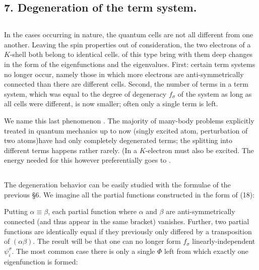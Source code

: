 \begin{paper}{1}
\section*{7. Degeneration of the term system.}
\subsection{} In the cases occurring in nature, the quantum cells are not all different from one another. Leaving the spin properties out of consideration, the two electrons of a $K$-shell both belong to identical cells.  of this type bring with them deep changes in the form of the eigenfunctions and the eigenvalues. First: certain term systems no longer occur, namely those in which more electrons are anti-symmetrically connected than there are different cells. Second, the number of terms in a term system, which was equal to the degree of degeneracy $f_\sigma$ of the system as long as all cells were different, is now smaller; often only a single term is left.

We name this last phenomenon . The majority of many-body problems explicitly treated in quantum mechanics up to now (singly excited  atom, perturbation of two  atoms)have had only completely degenerated terms; the splitting into different terms happens rather rarely. (In  a $K$-electron must also be excited. The energy needed for this however preferentially goes to .

\subsection{} The degeneration behavior can be easily studied with the formulae of the previous \S6. We imagine all the partial functions constructed in the form of (18):

Putting $\alpha \equiv \beta$, each partial function where $\alpha$ and $\beta$ are anti-symmetrically connected (and thus appear in the same bracket) vanishes. Further, two partial functions are identically equal if they previously only differed by a transposition of $(\alpha\beta)$. The result will be that one can no longer form $f_\sigma$ linearly-independent $\psi_i^\sigma$. The most common case there is only a single $\Phi$ left from which exactly one eigenfunction is formed:


\end{paper}
